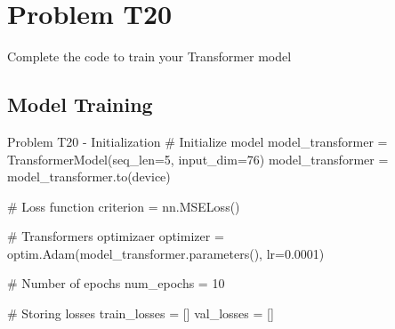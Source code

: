 \documentclass[12pt, a4paper]{article}
\begin{document}
    \pagebreak

        \section{Problem T20}
            Complete the code to train your Transformer model

            \subsection{Model Training}
                \begin{codeblock}{Problem T20 - Initialization}
                    # Initialize model
                    model_transformer = TransformerModel(seq_len=5, input_dim=76)
                    model_transformer = model_transformer.to(device)

                    # Loss function
                    criterion = nn.MSELoss()

                    # Transformers optimizaer
                    optimizer = optim.Adam(model_transformer.parameters(), lr=0.0001)

                    # Number of epochs
                    num_epochs = 10

                    # Storing losses
                    train_losses = []
                    val_losses = []
                \end{codeblock}
\end{document}

